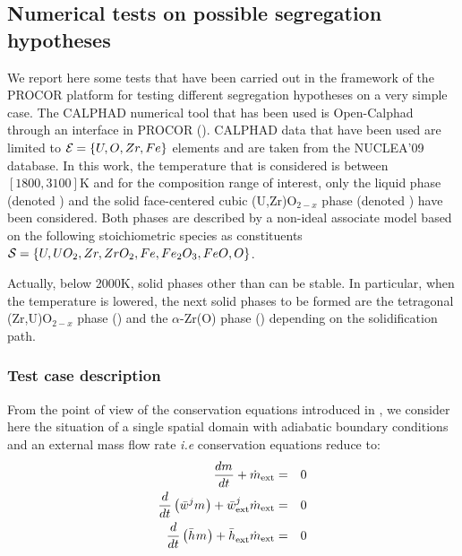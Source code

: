 \subsection{Numerical tests on possible segregation hypotheses} \label{sect:num}

We report here some tests that have been carried out in the framework of the PROCOR platform for testing different segregation hypotheses on a very simple case. The CALPHAD numerical tool that has been used is Open-Calphad through an interface in PROCOR (\cite{Sundman2016}). CALPHAD data that have been used are limited to $\elementSet = \left\{U,O,Zr,Fe\right\}$ elements and are taken from the NUCLEA'09 database. In this work, the temperature that is considered is between $[1800, 3100]$K and for the composition range of interest, only the liquid phase (denoted ) and the solid face-centered cubic (U,Zr)O$_{2-x}$ phase (denoted ) have been considered. Both phases are described by a non-ideal associate model based on the following stoichiometric species as constituents $\speciesSet = \left\{ U, UO_2, Zr, ZrO_2, Fe, Fe_2O_3, FeO, O \right\}$.
\begin{remark}{} 
Actually, below 2000K, solid phases other than  can be stable. In particular, when the temperature is lowered, the next solid phases to be formed are the tetragonal (Zr,U)O$_{2-x}$ phase () and the $\alpha$-Zr(O) phase () depending on the solidification path.
\end{remark}

\subsubsection{Test case description}

From the point of view of the conservation equations introduced in , we consider here the situation of a single spatial domain with adiabatic boundary conditions and an external mass flow rate \textit{i.e} conservation equations reduce to:
\begin{eqnarray}
 \frac{d\mass{}}{dt} + \dot{m}_{\textrm{ext}} &=& 0 \label{eq:bulk_m1}\\
 \frac{d}{dt} \left( \avMassFraction[j]{} \mass{} \right) + \avMassFraction[j]{\textrm{ext}} \dot{m}_{\textrm{ext}} &=& 0 \label{eq:bulk_w1} \\
 \frac{d}{dt} \left( \avMassEnthalpy{} \mass{} \right) + \avMassEnthalpy{\textrm{ext}} \dot{m}_{\textrm{ext}} &=& 0  \label{eq:bulk_h1}
\end{eqnarray}

